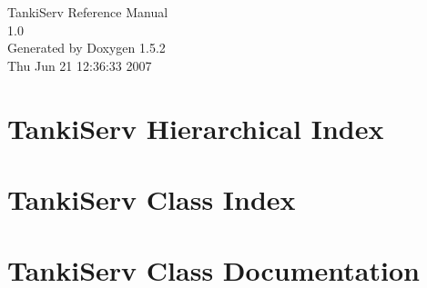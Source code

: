 \documentclass[a4paper]{book}
\begin{document}
\begin{titlepage}
\vspace*{7cm}
\begin{center}
{\Large TankiServ Reference Manual\\[1ex]\large 1.0 }\\
\vspace*{1cm}
{\large Generated by Doxygen 1.5.2}\\
\vspace*{0.5cm}
{\small Thu Jun 21 12:36:33 2007}\\
\end{center}
\end{titlepage}
\clearemptydoublepage
{}
\tableofcontents
\clearemptydoublepage
{}
\chapter{TankiServ Hierarchical Index}

\chapter{TankiServ Class Index}

\chapter{TankiServ Class Documentation}

















\printindex
\end{document}
